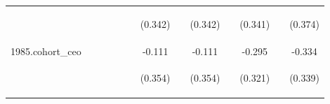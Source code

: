 \begin{center}
\begin{tabular}{lcccccccccccc}
\vspace{4pt} & \begin{footnotesize}\end{footnotesize} & \begin{footnotesize}\end{footnotesize} & \begin{footnotesize}\end{footnotesize} & \begin{footnotesize}\end{footnotesize} & \begin{footnotesize}\end{footnotesize} & \begin{footnotesize}(0.342)\end{footnotesize} & \begin{footnotesize}\end{footnotesize} & \begin{footnotesize}(0.342)\end{footnotesize} & \begin{footnotesize}\end{footnotesize} & \begin{footnotesize}(0.341)\end{footnotesize} & \begin{footnotesize}\end{footnotesize} & \begin{footnotesize}(0.374)\end{footnotesize} \\
1985.cohort\_ceo &  &  &  &  &  & -0.111 &  & -0.111 &  & -0.295 &  & -0.334 \\
\vspace{4pt} & \begin{footnotesize}\end{footnotesize} & \begin{footnotesize}\end{footnotesize} & \begin{footnotesize}\end{footnotesize} & \begin{footnotesize}\end{footnotesize} & \begin{footnotesize}\end{footnotesize} & \begin{footnotesize}(0.354)\end{footnotesize} & \begin{footnotesize}\end{footnotesize} & \begin{footnotesize}(0.354)\end{footnotesize} & \begin{footnotesize}\end{footnotesize} & \begin{footnotesize}(0.321)\end{footnotesize} & \begin{footnotesize}\end{footnotesize} & \begin{footnotesize}(0.339)\end{footnotesize} \\

\end{tabular}
\end{center}
